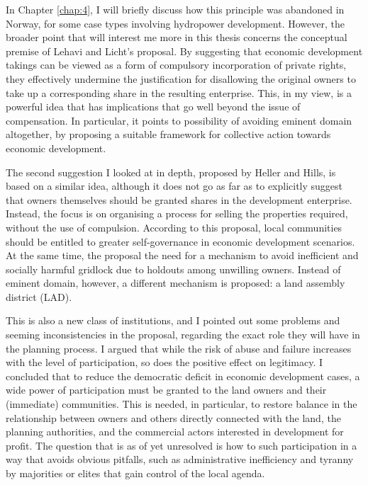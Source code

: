 In Chapter \ref{chap:4}, I will briefly discuss how this principle was abandoned in Norway, for some case types involving hydropower development. However, the broader point that will interest me more in this thesis concerns the conceptual premise of Lehavi and Licht's proposal. By suggesting that economic development takings can be viewed as a form of compulsory incorporation of private rights, they effectively undermine the justification for disallowing the original owners to take up a corresponding share in the resulting enterprise. This, in my view, is a powerful idea that has implications that go well beyond the issue of compensation. In particular, it points to possibility of avoiding eminent domain altogether, by proposing a suitable framework for collective action towards economic development.


The second suggestion I looked at in depth, proposed by Heller and Hills, is based on a similar idea, although it does not go as far as to explicitly suggest that owners themselves should be granted shares in the development enterprise. Instead, the focus is on organising a process for selling the properties required, without the use of compulsion. According to this proposal, local communities should be entitled to greater self-governance in economic development scenarios. At the same time, the proposal  the need for a mechanism to avoid inefficient and socially harmful gridlock due to holdouts among unwilling owners. Instead of eminent domain, however, a different mechanism is proposed: a land assembly district (LAD).

This is also a new class of institutions, and I pointed out some problems and seeming inconsistencies in the proposal, regarding the exact role they will have in the planning process. I argued that while the risk of abuse and failure increases with the level of participation, so does the positive effect on legitimacy. I concluded that to reduce the democratic deficit in economic development cases, a wide power of participation must be granted to the land owners and their (immediate) communities. This is needed, in particular, to restore balance in the relationship between owners and others directly connected with the land, the planning authorities, and the commercial actors interested in development for profit. The question that is as of yet unresolved is how to  such participation in a way that avoids obvious pitfalls, such as administrative inefficiency and tyranny by majorities or elites that gain control of the local agenda.

